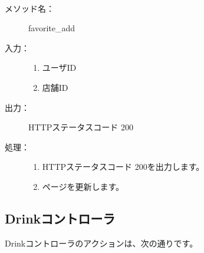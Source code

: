 \documentclass[a4j,titlepage]{jarticle}
\begin{document}
​
\begin{description}
\item [メソッド名：] favorite\_add
\item [入力：]
  \begin{enumerate}
    \item ユーザID
    \item 店舗ID
  \end{enumerate}
\item [出力：] HTTPステータスコード 200
\item [処理：] \mbox{}
  \begin{enumerate}
  \item HTTPステータスコード 200を出力します。
  \item ページを更新します。
　\end{enumerate}
\end{description}


\subsection{Drinkコントローラ}
Drinkコントローラのアクションは、次の通りです。
\end{document}
